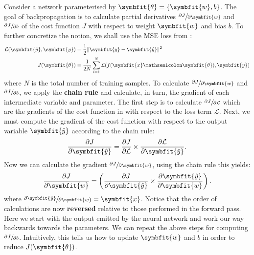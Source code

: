 Consider a network parameterised by $\symbfit{\theta} = \{\symbfit{w}, b\}$. The goal of backpropagation is to calculate partial derivatives \(\sfrac{\partial J}{\partial \symbfit{w}}\) and \(\sfrac{\partial J}{\partial b}\) of the cost function $J$ with respect to weight $\symbfit{w}$ and bias $b$. To further concretize the notion, we shall use the MSE loss from :
\begin{align}
    \mathcal{L}(\symbfit{\hat{y}}, \symbfit{y}) &= \frac{1}{2} \| \symbfit{y} - \symbfit{\hat{y}} \| ^ 2 \\
    J(\symbfit{\theta}) &= \frac{1}{2N} \sum_{i=1}^{N} \mathcal{L}(f(\symbfit{x} \mathsemicolon \symbfit{\theta}), \symbfit{y})
    \label{eqn:bp-cost-fn}
\end{align}
where $N$ is the total number of training samples. To calculate \(\sfrac{\partial J}{\partial \symbfit{w}}\) and \(\sfrac{\partial J}{\partial b}\), we apply the \textbf{chain rule} and calculate, in turn, the gradient of each intermediate variable and parameter. The first step is to calculate $\sfrac{\partial J}{\partial \mathcal{L}}$ which are the gradients of the cost function in  with respect to the loss term $\mathcal{L}$.
Next, we must compute the gradient of the cost function with respect to the output variable $\symbfit{\hat{y}}$ according to the chain rule:
\begin{equation}
    \frac{\partial J}{\partial \symbfit{\hat{y}}}
= \frac{\partial J}{\partial \mathcal{L}} \times \frac{\partial \mathcal{L}}{\partial \symbfit{\hat{y}}}.
\end{equation}
Now we can calculate the gradient \(\sfrac{\partial J}{\partial \symbfit{w}}\), using the chain rule this yields:
\begin{equation}
    \frac{\partial J}{\partial \symbfit{w}}= \left(\frac{\partial J}{\partial \symbfit{\hat{y}}} \times \frac{\partial \symbfit{\hat{y}}}{\partial \symbfit{w}}\right).
\end{equation}
where \(\sfrac{\partial \symbfit{\hat{y}}}{\partial \symbfit{w}} = \symbfit{x}\).
Notice that the order of calculations are now \textbf{reversed} relative to those performed in the forward pass. Here we start with the output emitted by the neural network and work our way backwards towards the parameters. We can repeat the above steps for computing \(\sfrac{\partial J}{\partial b}\). Intuitively, this tells us how to update $\symbfit{w}$ and $b$ in order to reduce $J(\symbfit{\theta})$.

